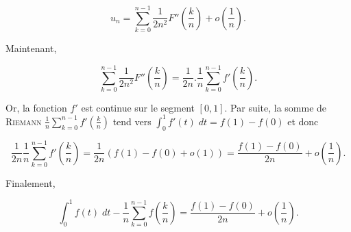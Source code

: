 {{$$u_n=\sum_{k=0}^{n-1}\frac{1}{2n^2}F''(\frac{k}{n})+o(\frac{1}{n}).$$

Maintenant, 

$$\sum_{k=0}^{n-1}\frac{1}{2n^2}F''(\frac{k}{n})=\frac{1}{2n}.\frac{1}{n}\sum_{k=0}^{n-1}f'(\frac{k}{n}).$$

Or, la fonction $f'$ est continue sur le segment $[0,1]$. Par suite, la somme de \textsc{Riemann} $\frac{1}{n}\sum_{k=0}^{n-1}f'(\frac{k}{n})$ tend vers $\int_{0}^{1}f'(t)\;dt=f(1)-f(0)$ et donc 

$$\frac{1}{2n}\frac{1}{n}\sum_{k=0}^{n-1}f'(\frac{k}{n})=\frac{1}{2n}(f(1)-f(0)+o(1))=\frac{f(1)-f(0)}{2n}+o(\frac{1}{n}).$$

Finalement,

$$\int_{0}^{1}f(t)\;dt-\frac{1}{n}\sum_{k=0}^{n-1}f(\frac{k}{n})=\frac{f(1)-f(0)}{2n}+o(\frac{1}{n}).$$
}
}
